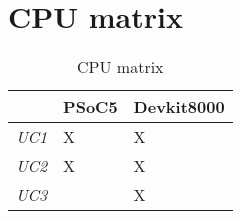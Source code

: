 \section{CPU matrix}

\begin{table}[H]
\centering
\caption{CPU matrix}
\label{CPUmatrix}

\begin{tabular}{ p{40pt} | p{80pt} | p{70 pt} }\hline
\rowcolor{white} & PSoC5 & Devkit8000\\
\hline
\rowcolor{white} \emph{UC1} & X & X\\

\rowcolor{white} \emph{UC2} & X & X\\

\rowcolor{white} \emph{UC3} & & X\\
\end{tabular}
\end{table}
